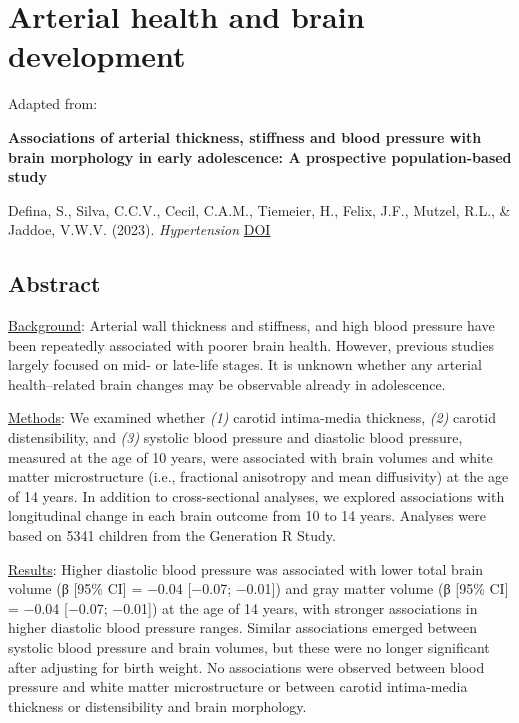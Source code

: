 \documentclass[
  letterpaper,
  DIV=11,
  numbers=noendperiod]{scrreport}
\begin{document}
\chapter{Arterial health and brain development}\label{sec-chapter7}

Adapted from:

\textbf{Associations of arterial thickness, stiffness and blood pressure
with brain morphology in early adolescence: A prospective
population-based study}

Defina, S., Silva, C.C.V., Cecil, C.A.M., Tiemeier, H., Felix, J.F.,
Mutzel, R.L., \& Jaddoe, V.W.V. (2023). \emph{Hypertension}
\href{https://doi.org/10.1161/HYPERTENSIONAHA.123.21672}{DOI}

\section*{Abstract}\label{abstract-5}


\ul{Background}: Arterial wall thickness and stiffness, and high blood
pressure have been repeatedly associated with poorer brain health.
However, previous studies largely focused on mid- or late-life stages.
It is unknown whether any arterial health--related brain changes may be
observable already in adolescence.

\ul{Methods}: We examined whether \emph{(1)} carotid intima-media
thickness, \emph{(2)} carotid distensibility, and \emph{(3)} systolic
blood pressure and diastolic blood pressure, measured at the age of 10
years, were associated with brain volumes and white matter
microstructure (i.e., fractional anisotropy and mean diffusivity) at the
age of 14 years. In addition to cross-sectional analyses, we explored
associations with longitudinal change in each brain outcome from 10 to
14 years. Analyses were based on 5341 children from the Generation R
Study.

\ul{Results}: Higher diastolic blood pressure was associated with lower
total brain volume (β {[}95\% CI{]} = −0.04 {[}−0.07; −0.01{]}) and gray
matter volume (β {[}95\% CI{]} = −0.04 {[}−0.07; −0.01{]}) at the age of
14 years, with stronger associations in higher diastolic blood pressure
ranges. Similar associations emerged between systolic blood pressure and
brain volumes, but these were no longer significant after adjusting for
birth weight. No associations were observed between blood pressure and
white matter microstructure or between carotid intima-media thickness or
distensibility and brain morphology.
\end{document}
